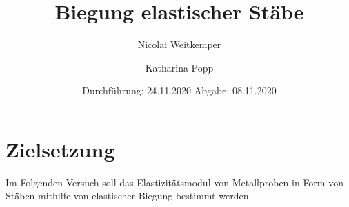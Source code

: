 

\subject{V103}
\title{Biegung elastischer Stäbe}
\author{Nicolai Weitkemper \and Katharina Popp}
\date{
    Durchführung: 24.11.2020
    \hspace{3em}
    Abgabe: 08.11.2020
}



\maketitle
\thispagestyle{empty}
\tableofcontents
\newpage


\section{Zielsetzung} \label{sec:Ziel}

    Im Folgenden Versuch soll das Elastizitätsmodul von Metallproben in Form von
    Stäben mithilfe von elastischer Biegung bestimmt werden.


\newpage


\newpage



